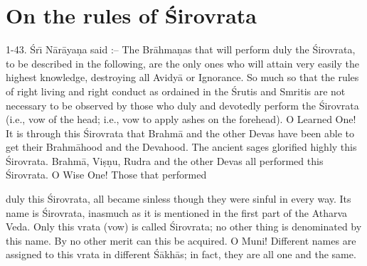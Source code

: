 \chapter{On the rules of \'Sirovrata}

1-43. \'Sr\={\i} N\=ar\=aya\d{n}a said :-- The Br\=ahma\d{n}as that will perform duly the \'Sirovrata, to be described in the following, are the only ones who will attain very easily the highest knowledge, destroying all Avidy\=a or Ignorance. So much so that the rules of right living and right conduct as ordained in the \'Srutis and Smritis are not necessary to be observed by those who duly and devotedly perform the \'Sirovrata (i.e., vow of the head; i.e., vow to apply ashes on the forehead). O Learned One! It is through this \'Sirovrata that Brahm\=a and the other Devas have been able to get their Brahm\=ahood and the Devahood. The ancient sages glorified highly this \'Sirovrata. Brahm\=a, Vi\d{s}\d{n}u, Rudra and the other Devas all performed this \'Sirovrata. O Wise One! Those that performed

duly this \'Sirovrata, all became sinless though they were sinful in every way. Its name is \'Sirovrata, inasmuch as it is mentioned in the first part of the Atharva Veda. Only this vrata (vow) is called \'Sirovrata; no other thing is denominated by this name. By no other merit can this be acquired. O Muni! Different names are assigned to this vrata in different \'S\=akh\=as; in fact, they are all one and the same.

